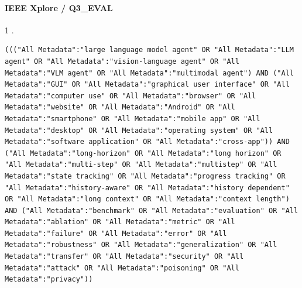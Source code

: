 \noindent\begin{minipage}{\linewidth}
\paragraph{IEEE Xplore / Q3\_EVAL}
1 .
\begin{lstlisting}
((("All Metadata":"large language model agent" OR "All Metadata":"LLM agent" OR "All Metadata":"vision-language agent" OR "All Metadata":"VLM agent" OR "All Metadata":"multimodal agent") AND ("All Metadata":"GUI" OR "All Metadata":"graphical user interface" OR "All Metadata":"computer use" OR "All Metadata":"browser" OR "All Metadata":"website" OR "All Metadata":"Android" OR "All Metadata":"smartphone" OR "All Metadata":"mobile app" OR "All Metadata":"desktop" OR "All Metadata":"operating system" OR "All Metadata":"software application" OR "All Metadata":"cross-app")) AND ("All Metadata":"long-horizon" OR "All Metadata":"long horizon" OR "All Metadata":"multi-step" OR "All Metadata":"multistep" OR "All Metadata":"state tracking" OR "All Metadata":"progress tracking" OR "All Metadata":"history-aware" OR "All Metadata":"history dependent" OR "All Metadata":"long context" OR "All Metadata":"context length") AND ("All Metadata":"benchmark" OR "All Metadata":"evaluation" OR "All Metadata":"ablation" OR "All Metadata":"metric" OR "All Metadata":"failure" OR "All Metadata":"error" OR "All Metadata":"robustness" OR "All Metadata":"generalization" OR "All Metadata":"transfer" OR "All Metadata":"security" OR "All Metadata":"attack" OR "All Metadata":"poisoning" OR "All Metadata":"privacy"))
\end{lstlisting}
\end{minipage}\par\medskip
